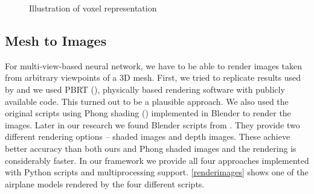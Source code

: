 \begin{figure}[!h]
	\centering
	\qquad
	\caption{Illustration of voxel representation}
\end{figure}

\subsection{Mesh to Images}
\label{subsec:meshtoimgs}
For multi-view-based neural network, we have to be able to render images taken from arbitrary viewpoints of a 3D mesh. First, we tried to replicate results used by \cite{su_multi-view_2015} and we used PBRT (\cite{pharr_physically_2010}), physically based rendering software with publicly available code. This turned out to be a plausible approach. We also used the original scripts using Phong shading (\cite{bishop_fast_1986}) implemented in Blender to render the images.
Later in our research we found Blender scripts from \cite{su_deeper_2018}. They provide two different rendering options -- shaded images and depth images. These achieve better accuracy than both ours and Phong shaded images and the rendering is considerably faster. In our framework we provide all four approaches implemented with Python scripts and multiprocessing support. \autoref{renderimages} shows one of the airplane models rendered by the four different scripts.

